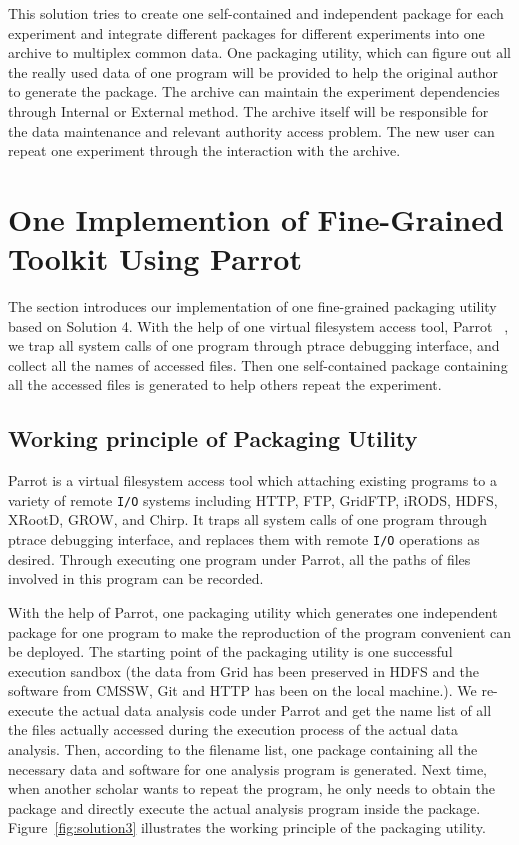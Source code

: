 \documentclass{sig-alternate}
\begin{document}
This solution tries to create one self-contained and independent package for
each experiment and integrate different packages for different experiments into
one archive to multiplex common data. One packaging utility, which can figure out all the really used data of one program  will be provided
to help the original author to generate the package. The archive can maintain
the experiment dependencies through Internal or External method. The archive
itself will be responsible for the data maintenance and relevant authority
access problem. The new user can repeat one experiment through the
interaction with the archive.

\section{One Implemention of Fine-Grained Toolkit Using Parrot}

The section introduces our implementation of one fine-grained packaging utility based on Solution 4. With the help of one
virtual filesystem access tool, Parrot ~\cite{thain2005parrot}, we trap all system calls of one
program through ptrace debugging interface, and collect all the names of accessed files. 
Then one self-contained package containing all the accessed files is generated to help others repeat the experiment.

\subsection{Working principle of Packaging Utility} 

Parrot is a virtual filesystem access tool which attaching existing programs to
a variety of remote {\tt I/O} systems including 
HTTP, FTP, GridFTP, iRODS, HDFS, XRootD, GROW, and Chirp. It traps all system calls of one program through ptrace
debugging interface, and replaces them with remote {\tt I/O} operations as desired.
Through executing one program under Parrot, all the paths of files involved in
this program can be recorded.  

With the help of Parrot, one packaging utility which generates one independent
package for one program to make the reproduction of the program convenient can
be deployed. The starting point of the packaging utility is one successful execution
sandbox (the data from Grid has been preserved in HDFS and the software from
CMSSW, Git and HTTP has been on the local machine.). We re-execute the actual
data analysis code under Parrot and get the name list of all the files actually
accessed during the execution process of the actual data analysis. Then,
according to the filename list, one package containing all the necessary data
and software for one analysis program is generated. Next time, when another
scholar wants to repeat the program, he only needs to obtain the package and
directly execute the actual analysis program inside the package. 
Figure~\ref{fig:solution3} illustrates the working principle of the packaging utility.
\end{document}
